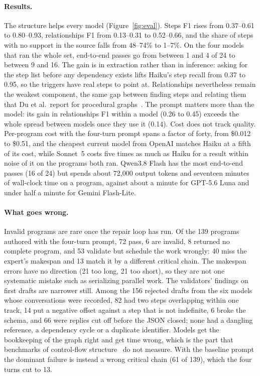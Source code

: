 \documentclass[10pt]{article}
\begin{document}
\paragraph{Results.} The structure helps every model (Figure~\ref{fig:eval}). Steps F1 rises from 0.37--0.61 to 0.80--0.93, relationships F1 from 0.13--0.31 to 0.52--0.66, and the share of steps with no support in the source falls from 48--74\% to 1--7\%. On the four models that ran the whole set, end-to-end passes go from between 1 and 4 of 24 to between 9 and 16. The gain is in extraction rather than in inference: asking for the step list before any dependency exists lifts Haiku's step recall from 0.37 to 0.95, so the triggers have real steps to point at. Relationships nevertheless remain the weakest component, the same gap between finding steps and relating them that Du et al.\ report for procedural graphs~\cite{du2024paged}. The prompt matters more than the model: its gain in relationships F1 within a model (0.26 to 0.45) exceeds the whole spread between models once they use it (0.14). Cost does not track quality. Per-program cost with the four-turn prompt spans a factor of forty, from \$0.012 to \$0.51, and the cheapest current model from OpenAI matches Haiku at a fifth of its cost, while Sonnet~5 costs five times as much as Haiku for a result within noise of it on the programs both ran. Qwen3.8 Flash has the most end-to-end passes (16 of 24) but spends about 72{,}000 output tokens and seventeen minutes of wall-clock time on a program, against about a minute for GPT-5.6 Luna and under half a minute for Gemini Flash-Lite.

\paragraph{What goes wrong.} Invalid programs are rare once the repair loop has run. Of the 139 programs authored with the four-turn prompt, 72 pass, 6 are invalid, 8 returned no complete program, and 53 validate but schedule the work wrongly: 40 miss the expert's makespan and 13 match it by a different critical chain. The makespan errors have no direction (21 too long, 21 too short), so they are not one systematic mistake such as serializing parallel work. The validators' findings on first drafts are narrower still. Among the 156 rejected drafts from the six models whose conversations were recorded, 82 had two steps overlapping within one track, 14 put a negative offset against a step that is not indefinite, 6 broke the schema, and 66 were replies cut off before the JSON closed; none had a dangling reference, a dependency cycle or a duplicate identifier. Models get the bookkeeping of the graph right and get time wrong, which is the part that benchmarks of control-flow structure~\cite{kourani2026bpm,du2024paged} do not measure. With the baseline prompt the dominant failure is instead a wrong critical chain (61 of 139), which the four turns cut to 13.
\end{document}
